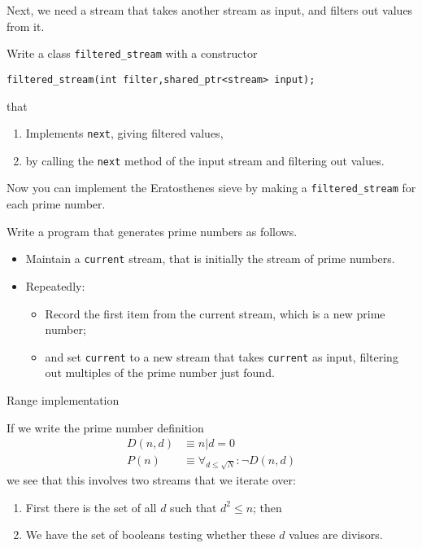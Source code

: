 Next, we need a stream that takes another stream as input, and filters
out values from it.

\begin{exercise}
  Write a class \lstinline{filtered_stream} with a constructor
\begin{lstlisting}
filtered_stream(int filter,shared_ptr<stream> input);
\end{lstlisting}
  that
  \begin{enumerate}
  \item Implements \lstinline{next}, giving filtered values,
  \item by calling the \lstinline{next} method of the input stream and
    filtering out values.
  \end{enumerate}
\end{exercise}

Now you can implement the Eratosthenes sieve by making a
\lstinline{filtered_stream} for each prime number.

\begin{exercise}
  Write a program that generates prime numbers as follows.
  \begin{itemize}
  \item Maintain a \lstinline{current} stream, that is initially the stream of
    prime numbers.
  \item Repeatedly:
    \begin{itemize}
    \item Record the first item from the current stream, which is a
      new prime number;
    \item and set \lstinline{current} to a new stream that takes \lstinline{current}
      as input, filtering out multiples of the prime number just found.
    \end{itemize}
  \end{itemize}
\end{exercise}

 {Range implementation}


If we write the prime number definition
\[ 
\begin{array}{ll}
  D(n,d)&\equiv n|d=0\\
  P(n) &\equiv \forall_{d\leq\sqrt N}\colon \neg D(n,d)
\end{array}
\]
we see that this involves two streams
that we iterate over:
\begin{enumerate}
\item First there is the set of all $d$
  such that $d^2\leq n$; then
\item We have the set of booleans testing whether
  these $d$ values are divisors.
\end{enumerate}

